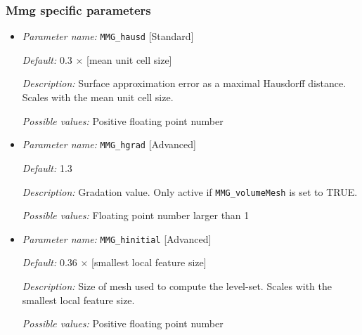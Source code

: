 \subsubsection{Mmg specific parameters} \label{parameters:mmg}
\begin{itemize}[itemsep=0.8em, parsep=0.3em]
	\item {\it Parameter name:} {\tt MMG\_hausd} \hfill [Standard]
	\label{parameters:me_hausd}
	
	
	{\it Default:} 0.3 $\times$ [mean unit cell size]
	
	{\it Description:} Surface approximation error as a maximal Hausdorff distance. Scales with the mean unit cell size.
	
	{\it Possible values:} Positive floating point number
	
	\item {\it Parameter name:} {\tt MMG\_hgrad} \hfill [Advanced]
	\label{parameters:me_hgrad}
	
	
	{\it Default:} 1.3
	
	{\it Description:} Gradation value. Only active if {\tt MMG\_volumeMesh} is set to TRUE.
	
	{\it Possible values:} Floating point number larger than 1
	
	\item {\it Parameter name:} {\tt MMG\_hinitial} \hfill [Advanced]
	\label{parameters:me_hinitial}
	
	
	{\it Default:} 0.36 $\times$ [smallest local feature size]
	
	{\it Description:} Size of mesh used to compute the level-set. Scales with the smallest local feature size.
	
	{\it Possible values:} Positive floating point number
	
\end{itemize}


